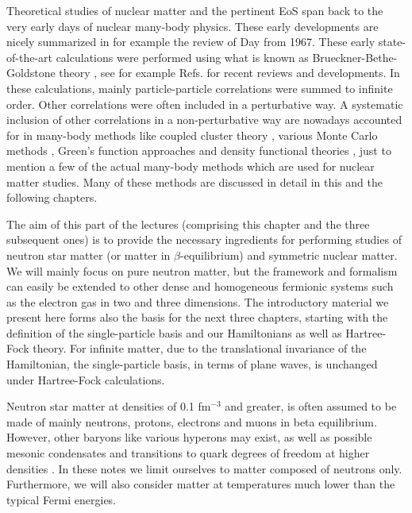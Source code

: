 Theoretical studies of nuclear matter and the pertinent EoS span back
to the very early days of nuclear many-body physics. These early
developments are nicely summarized in for example the review of Day
\cite{day1967} from 1967. These early state-of-the-art calculations
were performed using what is known as Brueckner-Bethe-Goldstone theory
\cite{brueckner1954,brueckner1955}, see for example
Refs.\cite{hh2000,baldo2012,baldo2012a,coraggio2013} for recent reviews and
developments.  In these calculations, mainly particle-particle
correlations were summed to infinite order.  Other correlations were
often included in a perturbative way. A systematic inclusion of other
correlations in a non-perturbative way are nowadays accounted for in
many-body methods like coupled cluster theory
\cite{bartlett2007,shavittbartlett2009,hagen2014,hagen2016,binder2013,jansen2016}, various Monte Carlo methods
\cite{carlson2003,gandolfi2009,gandolfi2009b,gezerlis2010,gandolfi2012,lovato2012,carlson2016}, Green's function approaches
\cite{baldo2012a,carbone2013,dickhoff2004} and density functional
theories \cite{erler2013}, just to mention a few of the actual
many-body methods which are used for nuclear matter studies. Many of these methods
are discussed in detail in this and the following chapters.


The aim of this part of the lectures (comprising this chapter and the
three subsequent ones) is to provide the necessary ingredients for
performing studies of neutron star matter (or matter in
$\beta$-equilibrium) and symmetric nuclear matter.  We will mainly
focus on pure neutron matter, but the framework and formalism can
easily be extended to other dense and homogeneous fermionic systems
such as the electron gas in two and three dimensions. The introductory
material we present here forms also the basis for the next three
chapters, starting with the definition of the single-particle basis
and our Hamiltonians as well as Hartree-Fock theory. For infinite
matter, due to the translational invariance of the Hamiltonian, the
single-particle basis, in terms of plane waves, is unchanged under
Hartree-Fock calculations.

Neutron star matter at densities of 0.1 fm$^{-3}$ and greater, is
often assumed to be made of mainly neutrons, protons, electrons and
muons in beta equilibrium. However, other baryons like various
hyperons may exist, as well as possible mesonic condensates and
transitions to quark degrees of freedom at higher densities
\cite{hh2000,Lattimer2007,prakash1996,steiner2010}.  In these notes we limit ourselves to matter composed
of neutrons only.  Furthermore, we will also consider matter at
temperatures much lower than the typical Fermi energies.

